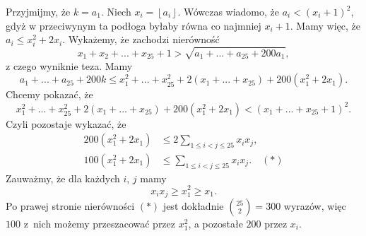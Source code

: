 \noindent
Przyjmijmy, że $k = a_1$.
Niech $x_i = \left\lfloor a_i \right\rfloor$. Wówczas wiadomo, że $a_i < (x_i + 1)^2$, gdyż w przeciwynym ta podłoga byłaby równa co najmniej $x_i + 1$. Mamy więc, że $a_i \leqslant x_i^2 + 2x_i$. Wykażemy, że zachodzi nierówność
\[
	x_1 + x_2 + ... + x_{25} + 1 > \sqrt{a_1 + ... + a_{25} + 200a_1},
\]
z czego wyniknie teza.
Mamy
\[
	a_1 + ... + a_{25} + 200k \leqslant x_1^2 + ... + x_{25}^2 + 2(x_1 + ... + x_{25}) + 200(x_1^2 + 2x_1).
\]
Chcemy pokazać, że
\[
	x_1^2 + ... + x_{25}^2 + 2(x_1 + ... + x_{25}) + 200(x_1^2 + 2x_1) < (x_1 + ... + x_{25} + 1)^2.
\]
Czyli pozostaje wykazać, że
\begin{align*}
	200(x_1^2 + 2x_1)  &\leqslant  2\sum_{1 \leqslant i < j \leqslant 25} x_ix_j, \\
	100(x_1^2 + 2x_1)  &\leqslant  \sum_{1 \leqslant i < j \leqslant 25} x_ix_j. \quad (*)
\end{align*}
Zauważmy, że dla każdych $i$, $j$ mamy
\[
	x_ix_j \geqslant x_1^2 \geqslant x_1.
\]
Po prawej stronie nierówności $(*)$ jest dokładnie ${{25}\choose{2}} = 300$ wyrazów, więc $100$ z~nich możemy przeszacować przez $x_{1}^2$, a pozostałe $200$ przez $x_i$.




